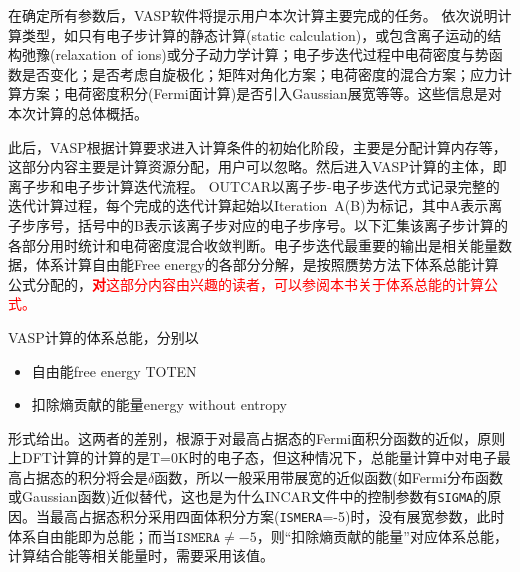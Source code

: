 在确定所有参数后，\textrm{VASP}软件将提示用户本次计算主要完成的任务。
{\fontsize{8.2pt}{6.2pt}\selectfont{
}}
依次说明计算类型，如只有电子步计算的静态计算\textrm{(static calculation)}，或包含离子运动的结构弛豫\textrm{(relaxation of ions)}或分子动力学计算；电子步迭代过程中电荷密度与势函数是否变化；是否考虑自旋极化；矩阵对角化方案；电荷密度的混合方案；应力计算方案；电荷密度积分(\textrm{Fermi}面计算)是否引入\textrm{Gaussian}展宽等等。这些信息是对本次计算的总体概括。

此后，\textrm{VASP}根据计算要求进入计算条件的初始化阶段，主要是分配计算内存等，这部分内容主要是计算资源分配，用户可以忽略。然后进入\textrm{VASP}计算的主体，即离子步和电子步计算迭代流程。
{\fontsize{8.2pt}{6.2pt}\selectfont{
}}
\textrm{OUTCAR}以离子步-电子步迭代方式记录完整的迭代计算过程，每个完成的迭代计算起始以\textrm{Iteration~A(B)}为标记，其中\textrm{A}表示离子步序号，括号中的\textrm{B}表示该离子步对应的电子步序号。以下汇集该离子步计算的各部分用时统计和电荷密度混合收敛判断。电子步迭代最重要的输出是相关能量数据，体系计算自由能\textrm{Free energy}的各部分分解，是按照赝势方法下体系总能计算公式分配的，\textcolor{red}{\textbf 对这部分内容由兴趣的读者，可以参阅本书关于体系总能的计算公式。}

\textrm{VASP}计算的体系总能，分别以
\begin{itemize}
	\item 自由能\textrm{free energy TOTEN}
	\item 扣除熵贡献的能量\textrm{energy without entropy}
\end{itemize}
形式给出。这两者的差别，根源于对最高占据态的\textrm{Fermi}面积分函数的近似，原则上\textrm{DFT}计算的计算的是\textrm{T=0K}时的电子态，但这种情况下，总能量计算中对电子最高占据态的积分将会是$\delta$函数，所以一般采用带展宽的近似函数(如\textrm{Fermi}分布函数或\textrm{Gaussian}函数)近似替代，这也是为什么\textrm{INCAR}文件中的控制参数有\texttt{SIGMA}的原因。当最高占据态积分采用四面体积分方案(\texttt{ISMERA}=-5)时，没有展宽参数，此时体系自由能即为总能；而当$\mathtt{ISMERA}\neq-5$，则``扣除熵贡献的能量''对应体系总能，计算结合能等相关能量时，需要采用该值。

